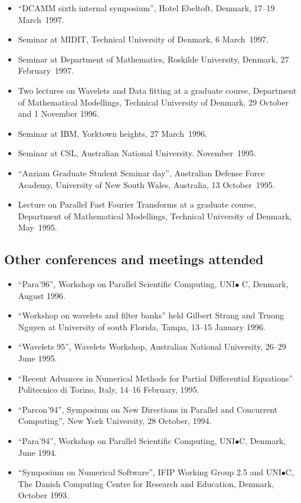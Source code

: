 \documentclass[12pt,a4paper]{article}
\begin{document}
\begin{itemize}
\item  ``DCAMM sixth internal symposium'', Hotel Ebeltoft, Denmark, 17--19 March\ 1997.
\item  Seminar at MIDIT, Technical University of Denmark, 6 March\ 1997.
\item  Seminar at Department of Mathematics, Roskilde University, Denmark, 27 February\ 1997.
\item  Two lectures on Wavelets and Data fitting at a graduate course,
Department of Mathematical Modellings, Technical University of Denmark, 29 October and 1 November 1996.
\item  Seminar at IBM, Yorktown heights, 27 March\ 1996.
\item  Seminar at CSL, Australian National University. November\ 1995.
\item  ``Anziam Graduate Student Seminar day'', Australian Defense Force Academy, University of New South Wales, Australia, 13 October\ 1995. %
\item  Lecture on Parallel Fast Fourier Transforms at a graduate course,
Department of Mathematical Modellings, Technical University of Denmark, May\ 1995.
\end{itemize}

\subsection*{Other conferences and meetings attended}

\begin{itemize}
\item  ``Para'96'', Workshop on Parallel Scientific Computing, UNI$\bullet $%
C, Denmark, August 1996.
\item  ``Workshop on wavelets and filter banks'' held Gilbert Strang and
Truong Nguyen at University of south Florida, Tampa, 13--15 January 1996.
\item  ``Wavelets 95'', Wavelets Workshop, Australian National University,
26--29 June 1995. 
\item  ``Recent Advances in Numerical Methods for Partial Differential
Equations'' Politecnico di Torino, Italy, 14--16 February, 1995.
\item  ``Parcon'94'', Symposium on New Directions in Parallel and Concurrent
Computing'', New York University, 28 October, 1994.
\item  ``Para'94'', Workshop on Parallel Scientific Computing, UNI$\bullet$C,
Denmark, June 1994.
\item  ``Symposium on Numerical Software'', IFIP Working Group 2.5 and
UNI$\bullet$C, The Danish Computing Centre for Research and Education, Denmark,
October 1993.
\end{itemize}
\end{document}
